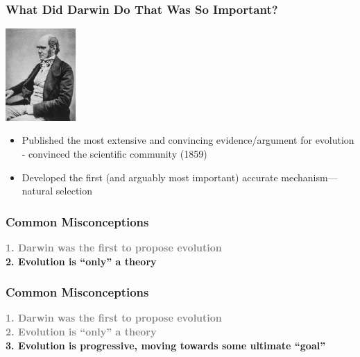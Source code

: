 \documentclass[10pt]{beamer}
\begin{document}
\begin{frame}[t]
\frametitle{What Did Darwin Do That Was So Important?}
	
	\begin{center}
		\includegraphics[width=0.20\textwidth]{figures/darwin.jpg}\\
	\end{center}
	
	\vspace{0.25cm}
	
	\begin{itemize}
		\item Published the most extensive and convincing evidence/argument for evolution - convinced the scientific community (1859) 
		\medskip
		\item Developed the first (and arguably most important) accurate mechanism---\textcolor{myblue}{natural selection}
	\end{itemize}
\end{frame}


\begin{frame}[t]
\frametitle{Common Misconceptions}
\vspace{0.5cm}
	
	\textbf{\textcolor{gray}{1. Darwin was the first to propose evolution}}\\
	\medskip
	\textbf{\textcolor{myblue}{2.} Evolution is ``only'' a theory}
\end{frame}


\begin{frame}[t]
\frametitle{Common Misconceptions}
\vspace{0.5cm}
	
	\textbf{\textcolor{gray}{1. Darwin was the first to propose evolution}}\\
	\medskip
	\textbf{\textcolor{gray}{2. Evolution is ``only'' a theory}}\\
	\medskip
	\textbf{\textcolor{myblue}{3.} Evolution is progressive, moving towards some ultimate ``goal''}
\end{frame}
\end{document}
